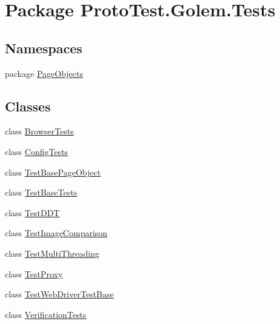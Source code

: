 \hypertarget{namespace_proto_test_1_1_golem_1_1_tests}{\section{Package Proto\-Test.\-Golem.\-Tests}
\label{namespace_proto_test_1_1_golem_1_1_tests}
}
\subsection*{Namespaces}
\begin{DoxyCompactItemize}
\item 
package \hyperlink{namespace_proto_test_1_1_golem_1_1_tests_1_1_page_objects}{Page\-Objects}
\end{DoxyCompactItemize}
\subsection*{Classes}
\begin{DoxyCompactItemize}
\item 
class \hyperlink{class_proto_test_1_1_golem_1_1_tests_1_1_browser_tests}{Browser\-Tests}
\item 
class \hyperlink{class_proto_test_1_1_golem_1_1_tests_1_1_config_tests}{Config\-Tests}
\item 
class \hyperlink{class_proto_test_1_1_golem_1_1_tests_1_1_test_base_page_object}{Test\-Base\-Page\-Object}
\item 
class \hyperlink{class_proto_test_1_1_golem_1_1_tests_1_1_test_base_tests}{Test\-Base\-Tests}
\item 
class \hyperlink{class_proto_test_1_1_golem_1_1_tests_1_1_test_d_d_t}{Test\-D\-D\-T}
\item 
class \hyperlink{class_proto_test_1_1_golem_1_1_tests_1_1_test_image_comparison}{Test\-Image\-Comparison}
\item 
class \hyperlink{class_proto_test_1_1_golem_1_1_tests_1_1_test_multi_threading}{Test\-Multi\-Threading}
\item 
class \hyperlink{class_proto_test_1_1_golem_1_1_tests_1_1_test_proxy}{Test\-Proxy}
\item 
class \hyperlink{class_proto_test_1_1_golem_1_1_tests_1_1_test_web_driver_test_base}{Test\-Web\-Driver\-Test\-Base}
\item 
class \hyperlink{class_proto_test_1_1_golem_1_1_tests_1_1_verification_tests}{Verification\-Tests}
\end{DoxyCompactItemize}

